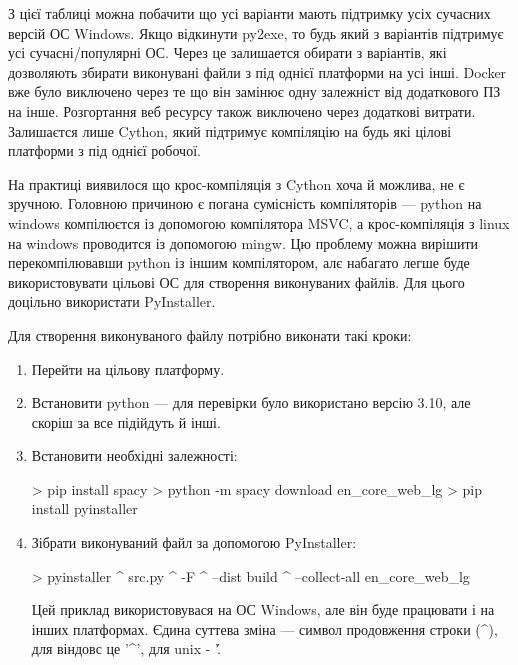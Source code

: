 \documentclass[14pt]{extarticle}
\begin{document}
  \newpage
  З цієї таблиці можна побачити що усі варіанти мають
  підтримку усіх сучасних версій ОС Windows.
  Якщо відкинути py2exe,
  то будь який з варіантів підтримує усі сучасні/популярні ОС.
  Через це залишается обирати з варіантів,
  які дозволяють збирати виконувані файли з під однієї платформи на усі інші.
  Docker вже було виключено через
  те що він замінює одну залежніст від додаткового ПЗ на інше.
  Розгортання веб ресурсу також виключено через додаткові витрати.
  Залишаєтся лише Cython, який підтримує компіляцію на
  будь які цілові платформи з під однієї робочої.

  На практиці виявилося що крос-компіляція з Cython хоча й можлива,
  не є зручною. Головною причиною є погана сумісність компіляторів ---
  python на windows компілюєтся із допомогою компілятора MSVC,
  а крос-компіляція з linux на windows проводится із допомогою mingw.
  Цю проблему можна вирішити перекомпілювавши python із іншим компілятором,
  алє набагато легше буде використовувати цільові ОС для створення
  виконуваних файлів. Для цього доцільно використати PyInstaller.

  Для створення виконуваного файлу потрібно виконати такі кроки:
  \begin{enumerate}[labelindent=\dimexpr\parindent*2\relax, leftmargin=*]
    \item Перейти на цільову платформу.
    \item Встановити python --- для перевірки було використано версію 3.10,
      але скоріш за все підійдуть й інші.
    \item Встановити необхідні залежності:
      \begin{mycode}[caption={Встановлення залежностей}, label={code:install_deps}]
        > pip install spacy
        > python -m spacy download en_core_web_lg
        > pip install pyinstaller
      \end{mycode}
    \item Зібрати виконуваний файл за допомогою PyInstaller:
    \begin{mycode}[caption={Збірка виконуваного файлу}, label={code:install_deps}]
      > pyinstaller ^
          src\main.py ^
          -F ^
          --dist build ^
          --collect-all en_core_web_lg
    \end{mycode}
    Цей приклад використовувася на ОС Windows,
    але він буде працювати і на інших платформах. Єдина суттева зміна ---
    символ продовження строки (\string^), для віндовс це '\string^',
    для unix - '\string\'.
  \end{enumerate}
\end{document}

